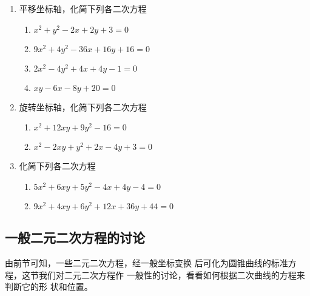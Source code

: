 \begin{ex}
\begin{enumerate}
    \item 平移坐标轴，化简下列各二次方程
\begin{enumerate}
\item $x^2+y^2-2x+2y+3=0$
\item $9x^2+4y^2-36x+16y+16=0$
\item $2x^2-4y^2+4x+4y-1=0$
\item $xy-6x-8y+20=0$
\end{enumerate}

    \item 旋转坐标轴，化简下列各二次方程
\begin{enumerate}
     \item $x^2+12xy+9y^2-16=0$
    \item $x^2-2xy+y^2+2x-4y+3=0$
\end{enumerate}    

    \item 化简下列各二次方程
\begin{enumerate}
    \item $5x^2+6xy+5y^2-4x+4y-4=0$
    \item $9x^2+4xy+6y^2+12x+36y+44=0$
\end{enumerate}
\end{enumerate}
\end{ex}

\subsection{一般二元二次方程的讨论}
由前节可知，一些二元二次方程，经一般坐标变换
后可化为圆锥曲线的标准方程，这节我们对二元二次方程作
一般性的讨论，看看如何根据二次曲线的方程来判断它的形
状和位置。

